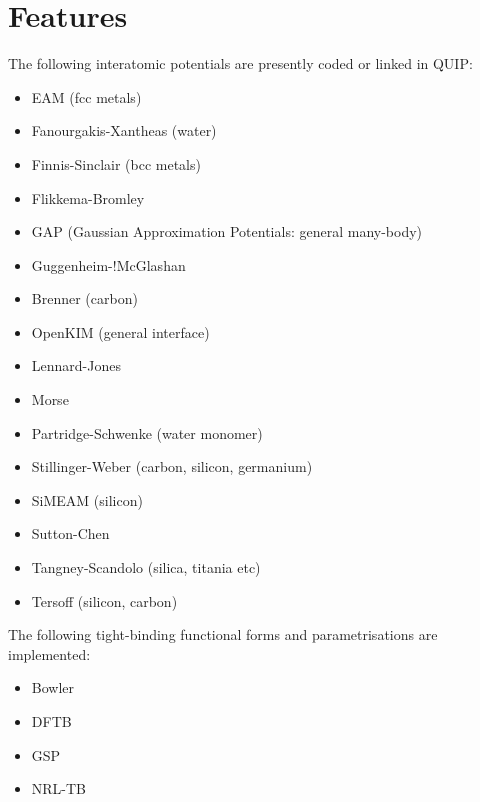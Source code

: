 \documentclass[letterpaper,10pt,english]{sphinxmanual}
\begin{document}
\chapter{Features}
\label{\detokenize{index:features}}
The following interatomic potentials are presently coded or linked in QUIP:
\begin{itemize}
\item {} 
EAM (fcc metals)

\item {} 
Fanourgakis-Xantheas (water)

\item {} 
Finnis-Sinclair (bcc metals)

\item {} 
Flikkema-Bromley

\item {} 
GAP (Gaussian Approximation Potentials: general many-body)

\item {} 
Guggenheim-!McGlashan

\item {} 
Brenner (carbon)

\item {} 
OpenKIM (general interface)

\item {} 
Lennard-Jones

\item {} 
Morse

\item {} 
Partridge-Schwenke (water monomer)

\item {} 
Stillinger-Weber (carbon, silicon, germanium)

\item {} 
SiMEAM (silicon)

\item {} 
Sutton-Chen

\item {} 
Tangney-Scandolo (silica, titania etc)

\item {} 
Tersoff (silicon, carbon)

\end{itemize}

The following tight-binding functional forms and parametrisations are implemented:
\begin{itemize}
\item {} 
Bowler

\item {} 
DFTB

\item {} 
GSP

\item {} 
NRL-TB

\end{itemize}
\end{document}
